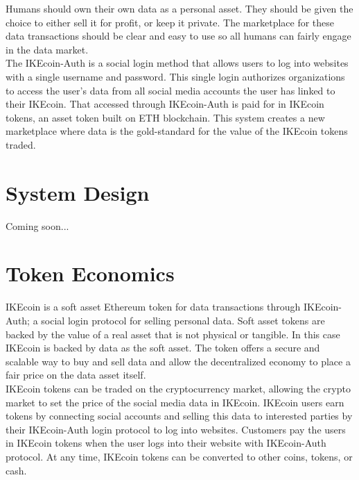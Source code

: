 \documentclass[12pt, letterpaper, twoside]{article}
\begin{document}
Humans should own their own data as a personal asset. They should be given the choice to either sell it for profit, or keep it private. The marketplace for these data transactions should be clear and easy to use so all humans can fairly engage in the data market. \\

The IKEcoin-Auth is a social login method that allows users to log into websites with a single username and password. This single login authorizes organizations to access the user's data from all social media accounts the user has linked to their IKEcoin. That accessed through IKEcoin-Auth is paid for in IKEcoin tokens, an asset token built on ETH blockchain. This system creates a new marketplace where data is the gold-standard for the value of the IKEcoin tokens traded. \\

\section{System Design}
Coming soon...


\section{Token Economics}
IKEcoin is a soft asset Ethereum token for data transactions through IKEcoin-Auth; a social login protocol for selling personal data. Soft asset tokens are backed by the value of a real asset that is not physical or tangible. In this case IKEcoin is backed by data as the soft asset. The token offers a secure and scalable way to buy and sell data and allow the decentralized economy to place a fair price on the data asset itself. \\

IKEcoin tokens can be traded on the cryptocurrency market, allowing the crypto market to set the price of the social media data in IKEcoin. IKEcoin users earn tokens by connecting social accounts and selling this data to interested parties by their IKEcoin-Auth login protocol to log into websites. Customers pay the users in IKEcoin tokens when the user logs into their website with IKEcoin-Auth protocol. At any time, IKEcoin tokens can be converted to other coins, tokens, or cash. \\
\end{document}
